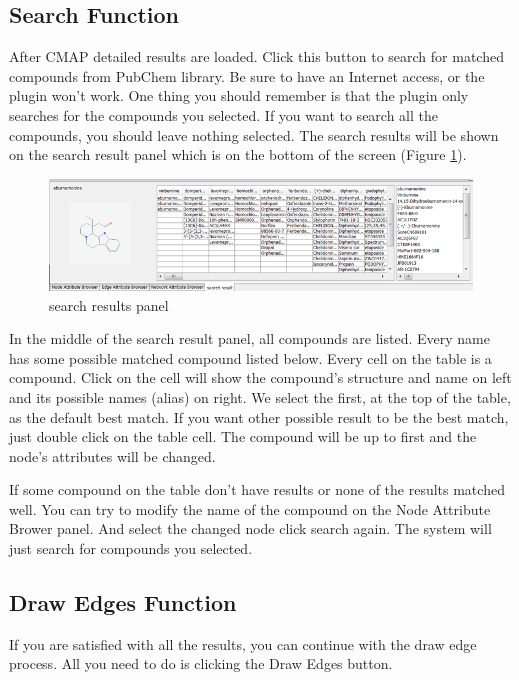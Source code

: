\documentclass{article}
\begin{document}
\subsection{Search Function}
After CMAP detailed results are loaded. Click this button to search for matched
compounds from PubChem library. Be sure to have an Internet access, or the
plugin won’t work. One thing you should remember is that the plugin only
searches for the compounds you selected. If you want to search all the
compounds, you should leave nothing selected. The search results will be shown
on the search result panel which is on the bottom of the screen (Figure
\ref{searchPanel}).

\begin{figure}[ht!]
	\centering
	\includegraphics[width=1\textwidth]{searchResults.png}
	\caption{search results panel}
	\label{searchPanel}
\end{figure}

In the middle of the search result panel, all compounds are listed. Every name
has some possible matched compound listed below. Every cell on the table is a
compound. Click on the cell will show the compound’s structure and name on left
and its possible names (alias) on right. We select the first, at the top of the
table, as the default best match. If you want other possible result to be the
best match, just double click on the table cell. The compound will be up to
first and the node’s attributes will be changed.
 
If some compound on the table don’t have results or none of the results matched
well. You can try to modify the name of the compound on the Node Attribute
Brower panel. And select the changed node click search again. The system will
just search for compounds you selected.

\subsection{Draw Edges Function}
If you are satisfied with all the results, you can continue with the draw edge
process. All you need to do is clicking the Draw Edges button.
\end{document}
